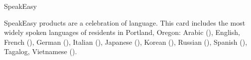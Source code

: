 \documentclass[10pt,letter]{article}
\begin{document}
\begin{insideleft} %

  \vfill

  \begin{center}
    \normalsize
    SpeakEasy
  \end{center}

  \vfill

  \footnotesize

  \aboutSpeakEasy{}

  \vfill

  SpeakEasy products are a celebration of language. This card includes the most
  widely spoken languages of residents in Portland, Oregon:
  Arabic (\textarabic{\langArabic{}}),
  English, %
  French (\textfrench{\langFrench{}}),
  German (\textgerman{\langGerman{}}),
  Italian (\textitalian{\langItalian{}}),
  Japanese ({\japanesefont{}\langJapanese{}}),
  Korean ({\koreanfont{}\langKorean{}}),
  Russian (\textrussian{\langRussian{}}),
  Spanish (\textspanish{\langSpanish{}}),
  Tagalog, %
  Vietnamese (\textvietnamese{\langVietnamese{}}).

  \vfill

  \elephantPaper{}

  \vfill

  \ccZeroNotice{}

  \vfill

  \githubReference{}

  \vfill


  \vfill

\end{insideleft} %



\end{document}
